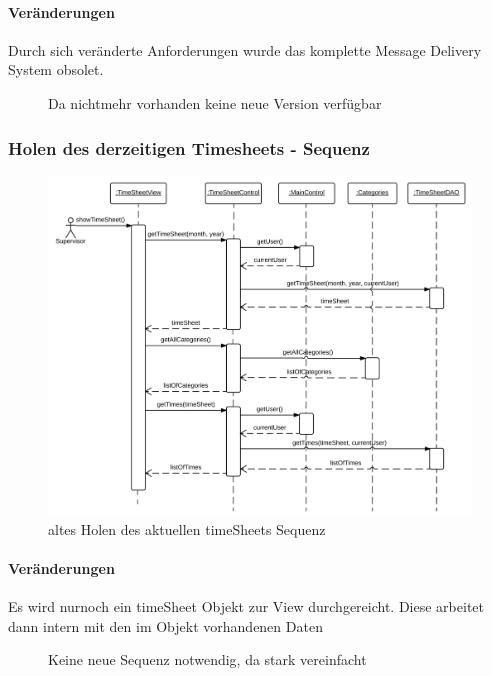             \paragraph{Veränderungen}
                Durch sich veränderte Anforderungen wurde das komplette Message Delivery System obsolet.
            \begin{figure}[H]
              \centering
               \caption{Da nichtmehr vorhanden keine neue Version verfügbar}
            \end{figure}


    \newpage
        \subsubsection{Holen des derzeitigen Timesheets - Sequenz}
            \begin{figure}[H]
              \centering
                \includegraphics[scale=0.1]{Get-current-timesheet.pdf}
               \caption{altes Holen des aktuellen timeSheets Sequenz}
            \end{figure}

            \paragraph{Veränderungen}
                Es wird nurnoch ein timeSheet Objekt zur View durchgereicht.
                Diese arbeitet dann intern mit den im Objekt vorhandenen Daten
            \begin{figure}[H]
              \centering
               \caption{Keine neue Sequenz notwendig, da stark vereinfacht}
            \end{figure}

